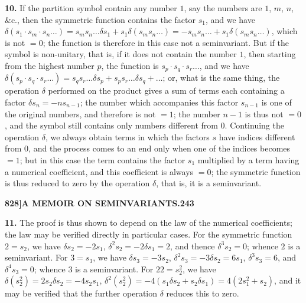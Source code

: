 \documentclass[11pt,a4paper]{book}
\begin{document}
\noindent\textbf{10.} If the partition symbol contain any number $1$, say the numbers are $1$, $m$, $n$, \&c., then the symmetric function contains the factor $s_1$, and we have $\delta(s_1 \cdot s_m \cdot s_n \dots) = s_m s_n \dots \delta s_1 + s_1 \delta(s_m s_n \dots) = -s_m s_n \dots + s_1 \delta(s_m s_n \dots)$, which is not $= 0$; the function is therefore in this case not a seminvariant. But if the symbol is non-unitary, that is, if it does not contain the number $1$, then starting from the highest number $p$, the function is $s_p \cdot s_q \cdot s_r \dots$, and we have $\delta(s_p \cdot s_q \cdot s_r \dots) = s_q s_r \dots \delta s_p + s_p s_r \dots \delta s_q + \dots$; or, what is the same thing, the operation $\delta$ performed on the product gives a sum of terms each containing a factor $\delta s_n = -ns_{n-1}$; the number which accompanies this factor $s_{n-1}$ is one of the original numbers, and therefore is not $= 1$; the number $n-1$ is thus not $= 0$, and the symbol still contains only numbers different from $0$. Continuing the operation $\delta$, we always obtain terms in which the factors $s$ have indices different from $0$, and the process comes to an end only when one of the indices becomes $= 1$; but in this case the term contains the factor $s_1$ multiplied by a term having a numerical coefficient, and this coefficient is always $= 0$; the symmetric function is thus reduced to zero by the operation $\delta$, that is, it is a seminvariant.

\newpage
\setcounter{page}{243}

\noindent\textbf{828]}\hfill\textbf{A MEMOIR ON SEMINVARIANTS.}\hfill\textbf{243}

\bigskip

\noindent\textbf{11.} The proof is thus shown to depend on the law of the numerical coefficients; the law may be verified directly in particular cases. For the symmetric function $2 = s_2$, we have $\delta s_2 = -2s_1$, $\delta^2 s_2 = -2\delta s_1 = 2$, and thence $\delta^3 s_2 = 0$; whence $2$ is a seminvariant. For $3 = s_3$, we have $\delta s_3 = -3s_2$, $\delta^2 s_3 = -3\delta s_2 = 6s_1$, $\delta^3 s_3 = 6$, and $\delta^4 s_3 = 0$; whence $3$ is a seminvariant. For $22 = s_2^2$, we have $\delta(s_2^2) = 2s_2 \delta s_2 = -4s_2 s_1$, $\delta^2(s_2^2) = -4(s_1 \delta s_2 + s_2 \delta s_1) = 4(2s_1^2 + s_2)$, and it may be verified that the further operation $\delta$ reduces this to zero.
\end{document}
